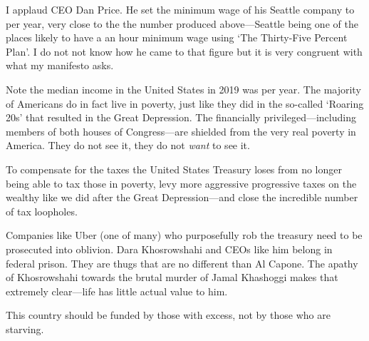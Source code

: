 I applaud CEO Dan Price. He set the minimum wage of his Seattle company to  per year, very close to the the number produced above---Seattle being one of the places likely to have a  an hour minimum wage using `The Thirty-Five Percent Plan'. I do not not know how he came to that figure but it is very congruent with what my manifesto asks.

Note the median income in the United States in 2019 was  per year. The majority of Americans do in fact live in poverty, just like they did in the so-called `Roaring 20s' that resulted in the Great Depression. The financially privileged---including members of both houses of Congress---are shielded from the very real poverty in America. They do not see it, they do not \emph{want} to see it.

To compensate for the taxes the United States Treasury loses from no longer being able to tax those in poverty, levy more aggressive progressive taxes on the wealthy like we did after the Great Depression---and close the incredible number of tax loopholes.

Companies like Uber (one of many) who purposefully rob the treasury need to be prosecuted into oblivion. Dara Khosrowshahi and CEOs like him belong in federal prison. They are thugs that are no different than Al Capone. The apathy of Khosrowshahi towards the brutal murder of Jamal Khashoggi makes that extremely clear---life has little actual value to him.

This country should be funded by those with excess, not by those who are starving.
